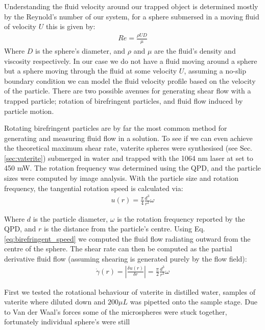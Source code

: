 Understanding the fluid velocity around our trapped object is determined 
mostly by the Reynold's number of our system, for a sphere submersed 
in a moving fluid of velocity $U$ this is given by:
\begin{align}
	Re = \frac{\rho UD}{\mu}
\end{align}
Where $D$ is the sphere's diameter, and $\rho$ and $\mu$ are the fluid's density and viscosity respectively. In our case we do not have a fluid moving around a sphere but a sphere moving through the fluid at some velocity $U$, assuming a no-slip boundary condition we can model the fluid velocity profile based on the velocity of the particle. There are two possible avenues for generating shear flow with a trapped particle; rotation of birefringent particles, and fluid flow induced by particle motion. 

Rotating birefringent particles are by far the most common method for generating and measuring fluid flow in a solution. To see if we can even achieve the theoretical maximum shear rate, vaterite spheres were synthesised (see Sec.\ref{sec:vaterite}) submerged in water and trapped with the 1064 nm laser at set to 450 mW. The rotation frequency was determined using the QPD, and the particle sizes were computed by image analysis. With the particle size and rotation frequency, the tangential rotation speed is calculated via:
\begin{align}
	\label{eq:birefringent_speed}
	u(r) = \frac{\pi}{4}\frac{d^3}{r^2}\omega
\end{align}

Where $d$ is the particle diameter, $\omega$ is the rotation frequency
reported by the QPD, and $r$ is the distance from the particle's centre. 
Using Eq.\ref{eq:birefringent_speed} we computed the fluid flow radiating
outward from the centre of the sphere. The shear rate can then be computed
as the partial derivative fluid flow (assuming shearing is generated purely
by the flow field):
\begin{align}
	\label{eq:birefringent_shear}
	\dot{\gamma}(r)=\left|\frac{\delta u(r)}{\delta r} \right|= \frac{\pi}{2}\frac{d^3}{r^3}\omega
\end{align}

First we tested the rotational behaviour of vaterite in distilled water, 
samples of vaterite where diluted down and $200\mu L$ was pipetted onto
the sample stage. Due to Van der Waal's forces some of the microspheres 
were stuck together, fortunately individual sphere's were still

